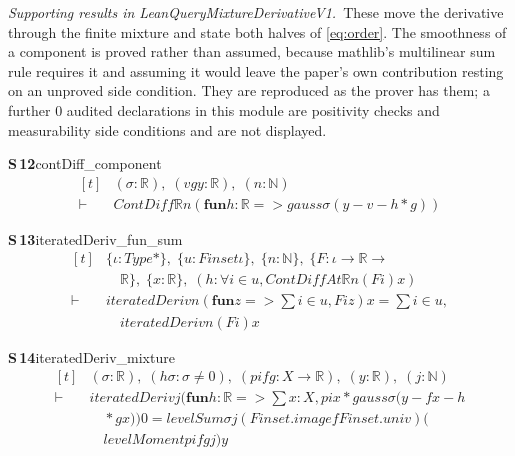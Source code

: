 \documentclass[conference]{IEEEtran}
\theoremstyle{definition}
\newcommand{\lean}[1]{\textsf{\footnotesize #1}}
\begin{document}
\noindent\emph{Supporting results in \lean{LeanQueryMixtureDerivativeV1}.}~These move the derivative through the finite mixture and state both halves of \eqref{eq:order}. The smoothness of a component is proved rather than assumed, because mathlib's multilinear sum rule requires it and assuming it would leave the paper's own contribution resting on an unproved side condition. They are reproduced as the prover has them; a further $0$ audited declarations in this module are positivity checks and measurability side conditions and are not displayed.

\noindent\textbf{S\,12}\quad\lean{contDiff\_component}
{\footnotesize\[ \begin{aligned}[t]
&(\sigma : \mathbb{R} ),\; (\mathit{v} \mathit{g} \mathit{y} : \mathbb{R} ),\; (\mathit{n} : \mathbb{N} )\\
\vdash\;&\mathit{ContDiff} \mathbb{R} \mathit{n} (\mathbf{fun} \mathit{h} : \mathbb{R} => \mathit{gauss} \sigma (\mathit{y} - \mathit{v} - \mathit{h} * \mathit{g}))
\end{aligned} \]}

\noindent\textbf{S\,13}\quad\lean{iteratedDeriv\_fun\_sum}
{\footnotesize\[ \begin{aligned}[t]
&\{ \iota : \mathit{Type}*\},\; \{ \mathit{u} : \mathit{Finset} \iota \},\; \{ \mathit{n} : \mathbb{N} \},\; \{ \mathit{F} : \iota \to \mathbb{R} \to\\
&\quad \mathbb{R} \},\; \{ \mathit{x} : \mathbb{R} \},\; (\mathit{h} : \forall \mathit{i} \in \mathit{u}, \mathit{ContDiffAt} \mathbb{R} \mathit{n} (\mathit{F} \mathit{i}) \mathit{x})\\
\vdash\;&\mathit{iteratedDeriv} \mathit{n} (\mathbf{fun} \mathit{z} => \textstyle\sum \mathit{i} \in \mathit{u}, \mathit{F} \mathit{i} \mathit{z}) \mathit{x} = \textstyle\sum \mathit{i} \in \mathit{u},\\
&\quad \mathit{iteratedDeriv} \mathit{n} (\mathit{F} \mathit{i}) \mathit{x}
\end{aligned} \]}

\noindent\textbf{S\,14}\quad\lean{iteratedDeriv\_mixture}
{\footnotesize\[ \begin{aligned}[t]
&(\sigma : \mathbb{R} ),\; (\mathit{hσ} : \sigma \neq 0),\; (\mathit{pi} \mathit{f} \mathit{g} : \mathit{X} \to \mathbb{R} ),\; (\mathit{y} : \mathbb{R} ),\; (\mathit{j} : \mathbb{N} )\\
\vdash\;&\mathit{iteratedDeriv} \mathit{j} (\mathbf{fun} \mathit{h} : \mathbb{R} => \textstyle\sum \mathit{x} : \mathit{X}, \mathit{pi} \mathit{x} * \mathit{gauss} \sigma (\mathit{y} - \mathit{f} \mathit{x} - \mathit{h}\\
&\quad * \mathit{g} \mathit{x})) 0 = \mathit{levelSum} \sigma \mathit{j} (\mathit{Finset}.\mathit{image} \mathit{f} \mathit{Finset}.\mathit{univ}) (\\
&\quad \mathit{levelMoment} \mathit{pi} \mathit{f} \mathit{g} \mathit{j}) \mathit{y}
\end{aligned} \]}
\end{document}

